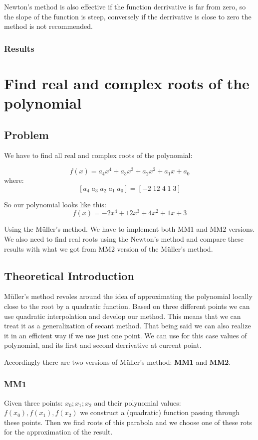 \documentclass[12pt]{report}
\begin{document}
Newton's method is also effective if the function derrivative is far from zero, so the slope of the function is steep, conversely if the derrivative is close to zero the method is not recommended.
\subsection{Results}


\chapter{Find real and complex roots of the polynomial}

\section{Problem}

We have to find all real and complex roots of the polynomial:

\[ f(x) = a_4x^4+a_3x^3+a_2x^2+a_1x+a_0 \]
where:
\[ [a_4 \; a_3 \; a_2 \; a_1 \; a_0] = [-2 \; 12 \; 4 \; 1 \; 3] \]

So our polynomial looks like this:
\[ f(x) = -2x^4+12x^3+4x^2+1x+3 \]

Using the M{\"u}ller's method. We have to implement both MM1 and MM2 versions. We also need to find real roots using the Newton's method and compare these results with what we got from MM2 version of the M{\"u}ller's method.
\section{Theoretical Introduction}
M{\"u}ller's method revoles around the idea of approximating the polynomial locally close to the root by a quadratic function. Based on three different points we can use quadratic interpolation and develop our method. This means that we can treat it as a generalization of secant method. That being said we can also realize it in an efficient way if we use just one point. We can use for this case values of polynomial, and its first and second derrivative at current point.

Accordingly there are two versions of M{\"u}ller's method: \textbf{MM1} and \textbf{MM2}.

\subsection{MM1}
Given three points: $x_0; x_1; x_2$ and their polynomial values: $f(x_0), f(x_1), f(x_2)$ we construct a (quadratic) function passing through these points. Then we find roots of this parabola and we choose one of these rots for the approximation of the result.
\end{document}

